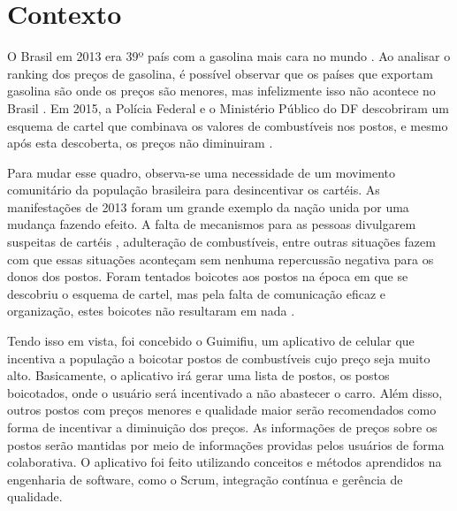 \section{Contexto}
 
O Brasil em 2013 era 39º país com a gasolina mais cara no mundo \cite{oglobo}. Ao analisar o ranking dos preços de gasolina, é possível observar que os países que exportam gasolina são onde os preços são menores, mas infelizmente isso não acontece no Brasil \cite{ranking-precos}. Em 2015, a Polícia Federal e o Ministério Público do DF descobriram um esquema de cartel que combinava os valores de combustíveis nos postos, e mesmo após esta descoberta, os preços não diminuiram \cite{correio-cartel}. 

Para mudar esse quadro, observa-se uma necessidade de um movimento comunitário da população brasileira para desincentivar os cartéis. As manifestações de 2013 foram um grande exemplo da nação unida por uma mudança fazendo efeito. A falta de mecanismos para as pessoas divulgarem suspeitas de cartéis \cite{manifestacoes-2013}, adulteração de combustíveis, entre outras situações fazem com que essas situações aconteçam sem nenhuma repercussão negativa para os donos dos postos. Foram tentados boicotes aos postos na época em que se descobriu o esquema de cartel, mas pela falta de comunicação eficaz e organização, estes boicotes não resultaram em nada \cite{boicotes-2016}.

Tendo isso em vista, foi concebido o Guimifiu, um aplicativo de celular que incentiva a população a boicotar postos de combustíveis cujo preço seja muito alto. Basicamente, o aplicativo irá gerar uma lista de postos, os postos boicotados, onde o usuário será incentivado a não abastecer o carro. Além disso, outros postos com preços menores e qualidade maior serão recomendados como forma de incentivar a diminuição dos preços. As informações de preços sobre os postos serão mantidas por meio de informações providas pelos usuários de forma colaborativa. O aplicativo foi feito utilizando conceitos e métodos aprendidos na engenharia de software, como o Scrum, integração contínua e gerência de qualidade.

